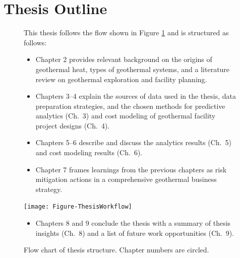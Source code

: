 \section{Thesis Outline}\label{ch1:outline}

\begin{figure}[!htp]
\onehalfspacing
\begin{minipage}[b]{0.53\textwidth}
This thesis follows the flow shown in Figure \ref{fig:thesis_flow} and is structured as follows: 
\begin{itemize}
\item Chapter 2 provides relevant background on the origins of geothermal heat, types of geothermal systems, and a literature review on geothermal exploration and facility planning.
\item Chapters 3--4 explain the sources of data used in the thesis, data preparation strategies, and the chosen methods for predictive analytics (Ch.\ 3) and cost modeling of geothermal facility project designs (Ch.\ 4).
\item Chapters 5--6 describe and discuss the analytics results (Ch.\ 5) and cost modeling results (Ch.\ 6).
\item Chapter 7 frames learnings from the previous chapters as risk mitigation actions in a comprehensive geothermal business strategy.
\end{itemize}
\end{minipage} \hfill
\begin{minipage}[b]{0.44\textwidth}
\texttt{[image: Figure-ThesisWorkflow]}
\caption[Flow chart for thesis structure]{Flow chart of thesis structure. Chapter numbers are circled.}
\label{fig:thesis_flow}
\end{minipage}
\begin{itemize}
\item Chapters 8 and 9 conclude the thesis with a summary of thesis insights (Ch.\ 8) and a list of future work opportunities (Ch.\ 9).
\end{itemize}
\end{figure}

